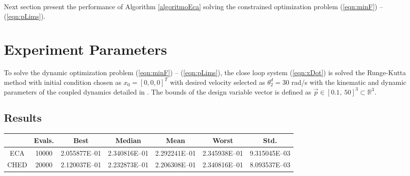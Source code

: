 \documentclass[12pt,letterpape]{article}
\begin{document}
Next section present the performance of Algorithm \ref{algoritmoEca} solving the
constrained optimization problem (\ref{eqn:minF}) -- (\ref{eqn:pLims}).

\section{Experiment Parameters} %
\label{sec:experiment_parameters}

To solve the dynamic optimization problem (\ref{eqn:minF}) -- (\ref{eqn:pLims}),
the close loop system (\ref{eqn:xDot}) is solved the Runge-Kutta method
\cite{dormand80} with initial condition chosen as $x_0 = [0,0,0]^T$ with desired
velocity selected as $\theta_2^d = 30$ rad/s with the kinematic and dynamic parameters
of the coupled dynamics detailed in \cite{calva13}. The bounds of the design
variable vector is defined as $\vec{p} \in [0.1, \ 50]^3 \subset \mathbb{R}^3 $.


\subsection{Results} %
\label{sub:results}


\begin{table}[!ht]
	\centering
	\begin{tabular}{ccccccc}
		\hline
		& {\bf Evals.} & {\bf Best} & {\bf Median} & {\bf Mean} & {\bf Worst} & {\bf Std.} \\ \hline
		ECA & 10000 & 2.055877E--01 & 2.340816E--01 & 2.292241E--01 & 2.345938E--01 & 9.315045E--03 \\ \hline
		CHED & 20000 & 2.120037E--01 & 2.232873E--01 & 2.206308E--01 & 2.340816E--01 & 8.093537E--03 \\ \hline
	\end{tabular}
\end{table}




\clearpage


\end{document}
